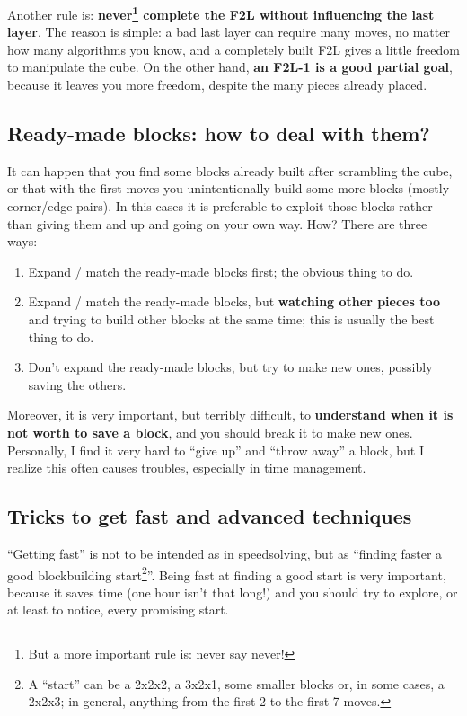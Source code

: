 \documentclass[11pt,a4paper]{book}
\begin{document}
Another rule is: \textbf{never\footnote{But a more important rule is: never say never!} complete the F2L without influencing the last layer}. The reason is simple: a bad last layer can require many moves, no matter how many algorithms you know, and a completely built F2L gives a little freedom to manipulate the cube. On the other hand, \textbf{an F2L-1 is a good partial goal}, because it leaves you more freedom, despite the many pieces already placed.

\subsection{Ready-made blocks: how to deal with them?}
\label{ready-made}

It can happen that you find some blocks already built after scrambling the cube, or that with the first moves you unintentionally build some more blocks (mostly corner/edge pairs). In this cases it is preferable to exploit those blocks rather than giving them and up and going on your own way. How? There are three ways:

\begin{enumerate}
\item Expand / match the ready-made blocks first; the obvious thing to do.
\item Expand / match the ready-made blocks, but \textbf{watching other pieces too} and trying to build other blocks at the same time; this is usually the best thing to do.
\item Don't expand the ready-made blocks, but try to make new ones, possibly saving the others.
\end{enumerate}

Moreover, it is very important, but terribly difficult, to \textbf{understand when it is not worth to save a block}, and you should break it to make new ones. Personally, I find it very hard to ``give up'' and ``throw away'' a block, but I realize this often causes troubles, especially in time management.

\subsection{Tricks to get fast and advanced techniques}

``Getting fast'' is not to be intended as in speedsolving, but as ``finding faster a good blockbuilding start\footnote{A ``start'' can be a 2x2x2, a 3x2x1, some smaller blocks or, in some cases, a 2x2x3; in general, anything from the first 2 to the first 7 moves.}''. Being fast at finding a good start is very important, because it saves time (one hour isn't that long!) and you should try to explore, or at least to notice, every promising start.
\end{document}
